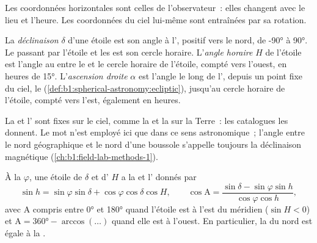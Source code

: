 Les coordonnées horizontales sont celles de l'observateur~: elles changent
avec le lieu et l'heure. Les coordonnées du ciel lui-même sont entraînées par
sa rotation.

\begin{definition}\label{def:b1:spherical-astronomy:equatorial}
La \emph{déclinaison}
$\delta$ d'une étoile est son angle à l', positif vers le
nord, de \ang{-90} à \ang{90}. Le  passant par l'étoile et les
 est son cercle horaire. L'\emph{angle horaire} $H$ de
l'étoile est l'angle au  entre le  et le cercle
horaire de l'étoile, compté vers l'ouest, en heures de \ang{15}.
L'\emph{ascension droite} $\alpha$ est l'angle le long de l',
depuis un point fixe du ciel, le 
(\cref{def:b1:spherical-astronomy:ecliptic}), jusqu'au cercle horaire de
l'étoile, compté vers l'est, également en heures.
\end{definition}

La  et l' sont fixes sur le ciel, comme la 
et la  sur la Terre~: les catalogues les donnent. Le mot 
n'est employé ici que dans ce sens astronomique~; l'angle entre le nord
géographique et le nord d'une boussole s'appelle toujours la déclinaison
magnétique (\cref{ch:b1:field-lab-methods-1}).

\begin{proposition}\label{prop:b1:spherical-astronomy:transform}
À la  $\varphi$, une étoile de  $\delta$ et d'
$H$ a la  et l' donnés par
\[
  \sin h = \sin\varphi\sin\delta + \cos\varphi\cos\delta\cos H,
  \qquad
  \cos\mathrm{A} = \frac{\sin\delta - \sin\varphi\sin h}{\cos\varphi\cos h},
\]
avec $\mathrm{A}$ compris entre \ang{0} et \ang{180} quand l'étoile est à l'est
du méridien ($\sin H < 0$) et $\mathrm{A} = \ang{360} - \arccos(\dots)$ quand
elle est à l'ouest. En particulier, la  du  nord est égale à
la .
\end{proposition}

